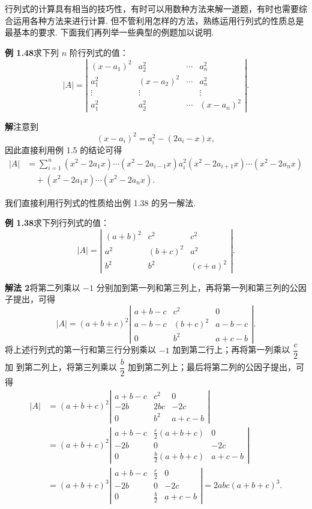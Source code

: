 \documentclass[UTF8,12pt,a4paper,fontset=fandol]{ctexart}
\begin{document}
行列式的计算具有相当的技巧性，有时可以用数种方法来解一道题，有时也需要综合运用各种方法来进行计算. 但不管利用怎样的方法，熟练运用行列式的性质总是最基本的要求. 下面我们再列举一些典型的例题加以说明.

\noindent\textbf{例 1.48}\quad 求下列 $n$ 阶行列式的值：
\[
|A|=\left|\begin{array}{cccc}
(x-a_1)^2 & a_2^2 & \cdots & a_n^2\\
a_1^2 & (x-a_2)^2 & \cdots & a_n^2\\
\vdots & \vdots &        & \vdots\\
a_1^2 & a_2^2 & \cdots & (x-a_n)^2
\end{array}\right|.
\]

\noindent\textbf{解}\quad 注意到
\[
(x-a_i)^2=a_i^2-(2a_i-x)x,
\]
因此直接利用例 1.5 的结论可得
\[
\begin{aligned}
|A|
&=\sum_{i=1}^n(x^2-2a_1x)\cdots(x^2-2a_{i-1}x)a_i^2
(x^2-2a_{i+1}x)\cdots(x^2-2a_nx)\\
&\quad+(x^2-2a_1x)\cdots(x^2-2a_nx).
\end{aligned}
\]

我们直接利用行列式的性质给出例 1.38 的另一解法.

\noindent\textbf{例 1.38}\quad 求下列行列式的值：
\[
|A|=\left|\begin{array}{ccc}
(a+b)^2 & c^2 & c^2\\
a^2 & (b+c)^2 & a^2\\
b^2 & b^2 & (c+a)^2
\end{array}\right|.
\]

\noindent\textbf{解法 2}\quad 将第二列乘以 $-1$ 分别加到第一列和第三列上，再将第一列和第三列的公因子提出，可得
\[
|A|=(a+b+c)^2
\left|\begin{array}{ccc}
a+b-c & c^2 & 0\\
a-b-c & (b+c)^2 & a-b-c\\
0 & b^2 & a+c-b
\end{array}\right|.
\]
将上述行列式的第一行和第三行分别乘以 $-1$ 加到第二行上；再将第一列乘以 $\dfrac c2$ 加
到第二列上，将第三列乘以 $\dfrac b2$ 加到第二列上；最后将第二列的公因子提出，可得
\[
\begin{aligned}
|A|
&=(a+b+c)^2
\left|\begin{array}{ccc}
a+b-c & c^2 & 0\\
-2b & 2bc & -2c\\
0 & b^2 & a+c-b
\end{array}\right|\\
&=(a+b+c)^2
\left|\begin{array}{ccc}
a+b-c & \frac c2(a+b+c) & 0\\
-2b & 0 & -2c\\
0 & \frac b2(a+b+c) & a+c-b
\end{array}\right|\\
&=(a+b+c)^3
\left|\begin{array}{ccc}
a+b-c & \frac c2 & 0\\
-2b & 0 & -2c\\
0 & \frac b2 & a+c-b
\end{array}\right|
=2abc(a+b+c)^3.
\end{aligned}
\]
\end{document}
